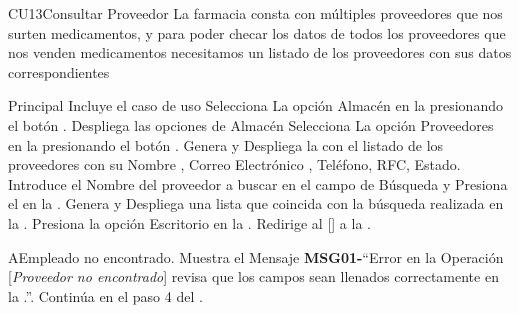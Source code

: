 \begin{UseCase}{CU13}{Consultar Proveedor}{
		La farmacia consta con múltiples proveedores que nos surten medicamentos,  y para poder checar los datos de todos los proveedores que nos venden medicamentos necesitamos un listado de los proveedores con sus datos correspondientes
	}
	\end{UseCase}
	\begin{UCtrayectoria}{Principal}
		\UCpaso Incluye el caso de uso 
		\UCpaso[\UCactor] Selecciona La opción Almacén en la  presionando el botón .
		\UCpaso Despliega las opciones de Almacén  
		\UCpaso [\UCactor] Selecciona La opción Proveedores en la  presionando el botón .
		\UCpaso Genera y Despliega la  con el listado de los proveedores con su Nombre , Correo Electrónico , Teléfono, RFC, Estado.
		\UCpaso[\UCactor] Introduce el Nombre del proveedor a buscar en el campo de Búsqueda y Presiona el  en la .
		\UCpaso Genera y Despliega una lista que coincida con la búsqueda realizada en la . 
		\UCpaso [\UCactor] Presiona la opción Escritorio en la .
		\UCpaso Redirige al [\UCactor] a la  .
	\end{UCtrayectoria}


\begin{UCtrayectoriaA}{A}{Empleado no encontrado.}
			\UCpaso Muestra el Mensaje {\bf MSG01-}``Error en la Operación [{\em Proveedor no encontrado}] revisa que los campos sean llenados correctamente en la .''.
			\UCpaso Continúa en el paso 4 del .
		\end{UCtrayectoriaA}
